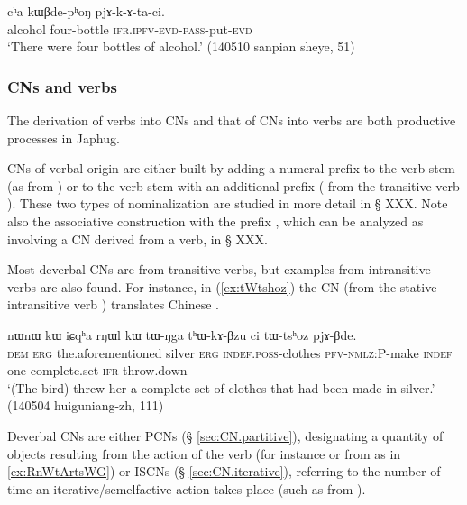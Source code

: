 \begin{exe}
\ex \label{ex:kWBdephoN}
\gll cʰa kɯβde-pʰoŋ pjɤ-k-ɤ-ta-ci. \\
alcohol four-bottle \textsc{ifr}.\textsc{ipfv}-\textsc{evd}-\textsc{pass}-put-\textsc{evd} \\
\glt  `There were four bottles of alcohol.' (140510 sanpian sheye, 51)
\end{exe}
\subsubsection{CNs and verbs}   \label{sec:CN.verbs}
The derivation of verbs into CNs and that of CNs into verbs are both productive processes in Japhug. 

CNs of verbal origin are either built by adding a numeral prefix to the verb stem (as  from ) or to the verb stem with an additional prefix  ( from the transitive verb ). These two types of nominalization are studied in more detail in § XXX. Note also the associative  construction with the prefix , which can be analyzed as involving a CN derived from a verb, in § XXX. %

Most deverbal CNs are from transitive verbs, but examples from intransitive verbs are also found. For instance, in (\ref{ex:tWtshoz}) the CN  (from the stative intransitive verb ) translates Chinese .

\begin{exe}
\ex \label{ex:tWtshoz}
\gll nɯnɯ kɯ iɕqʰa rŋɯl kɯ tɯ-ŋga tʰɯ-kɤ-βzu ci tɯ-tsʰoz pjɤ-βde. \\
\textsc{dem} \textsc{erg} the.aforementioned silver \textsc{erg} \textsc{indef}.\textsc{poss}-clothes \textsc{pfv}-\textsc{nmlz}:P-make \textsc{indef} one-complete.set \textsc{ifr}-throw.down \\
\glt `(The bird) threw her a complete set of clothes that had been made in silver.'  (140504 huiguniang-zh, 111)
\end{exe}

Deverbal CNs are either PCNs (§ \ref{sec:CN.partitive}), designating a quantity of objects resulting from the action of the verb (for instance  or  from  as in \ref{ex:RnWtArtsWG}) or ISCNs (§ \ref{sec:CN.iterative}), referring to the number of time an iterative/semelfactive action takes place (such as  from ).

